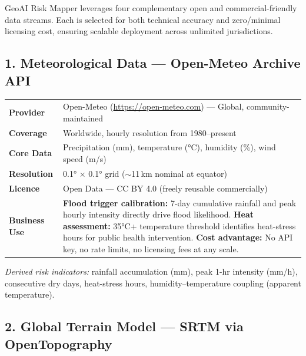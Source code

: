 \documentclass[11pt, a4paper]{article}
\begin{document}
GeoAI Risk Mapper leverages four complementary open and commercial-friendly data streams.
Each is selected for both technical accuracy and zero/minimal licensing cost, ensuring
scalable deployment across unlimited jurisdictions.

\subsection{1. Meteorological Data — Open-Meteo Archive API}

\begin{tabularx}{\linewidth}{>{\bfseries}p{4cm} X}
\toprule
\textbf{Provider}     & Open-Meteo (\url{https://open-meteo.com}) — Global, community-maintained \\
\textbf{Coverage}    & Worldwide, hourly resolution from 1980–present \\
\textbf{Core Data}   & Precipitation (mm), temperature (°C), humidity (\%), wind speed (m/s) \\
\textbf{Resolution}  & 0.1° × 0.1° grid ($\sim$11\,km nominal at equator) \\
\textbf{Licence}     & Open Data — CC BY 4.0 (freely reusable commercially) \\
\textbf{Business Use} & \textbf{Flood trigger calibration:} 7-day cumulative rainfall and peak hourly intensity directly drive flood likelihood. \textbf{Heat assessment:} 35°C+ temperature threshold identifies heat-stress hours for public health intervention. \textbf{Cost advantage:} No API key, no rate limits, no licensing fees at any scale. \\
\bottomrule
\end{tabularx}

\vspace{6pt}
\textit{Derived risk indicators:} rainfall accumulation (mm), peak 1-hr intensity (mm/h),
consecutive dry days, heat-stress hours, humidity–temperature coupling (apparent temperature).

\subsection{2. Global Terrain Model — SRTM via OpenTopography}
\end{document}

